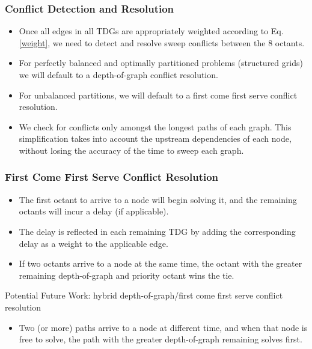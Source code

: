\documentclass[xcolor={usenames,dvipsnames,svgnames,table}]{beamer}
\begin{document}
\begin{frame}[t]\frametitle{Conflict Detection and Resolution}
\begin{block}{}
\begin{itemize}
	\item Once all edges in all TDGs are appropriately weighted according to Eq. \ref{weight}, we need to detect and resolve sweep conflicts between the 8 octants.
	\item For perfectly balanced and optimally partitioned problems (structured grids) we will default to a depth-of-graph conflict resolution.
	\item For unbalanced partitions, we will default to a first come first serve conflict resolution.
    \item We check for conflicts only amongst the longest paths of each graph. This simplification takes into account the upstream dependencies of each node, without losing the accuracy of the time to sweep each graph.
\end{itemize}
\end{block}
\end{frame}

\begin{frame}[t]\frametitle{First Come First Serve Conflict Resolution}
\begin{block}{}
\begin{itemize}
	\item The first octant to arrive to a node will begin solving it, and the remaining octants will incur a delay (if applicable).
	\item The delay is reflected in each remaining TDG by adding the corresponding delay as a weight to the applicable edge.
	\item If two octants arrive to a node at the same time, the octant with the greater remaining depth-of-graph and priority octant wins the tie.
\end{itemize}
\end{block}
\begin{block}{Potential Future Work: hybrid depth-of-graph/first come first serve conflict resolution}
\begin{itemize}
	\item Two (or more) paths arrive to a node at different time, and when that node is free to solve, the path with the greater depth-of-graph remaining solves first.
\end{itemize}
\end{block}
\end{frame}
\end{document}
